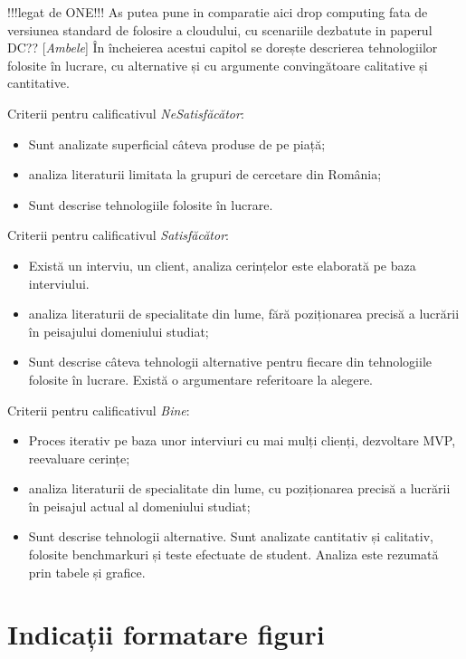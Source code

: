 \documentclass[12pt,a4paper]{report}
\newcommand{\worktype}[1]{[\textit{#1}] }
\newcommand{\dezvoltare}{\worktype{Dezvoltare de produs}}
\newcommand{\cercetare}{\worktype{Cercetare}}
\newcommand{\ambele}{\worktype{Ambele}}
\begin{document}
!!!legat de ONE!!!
As putea pune in comparatie aici drop computing fata de versiunea standard de folosire a cloudului, cu scenariile dezbatute in paperul DC??
\ambele În încheierea acestui capitol se dorește descrierea tehnologiilor folosite în lucrare, cu alternative și cu argumente convingătoare calitative și cantitative.  


Criterii pentru calificativul \textit{Ne\textit{Satisfăcător}}: 
\begin{itemize}
	\item \dezvoltare Sunt analizate superficial câteva produse de pe piață; 
	\item \cercetare analiza literaturii limitata la grupuri de cercetare din România;
	\item \ambele Sunt descrise tehnologiile folosite în lucrare. 
\end{itemize}

Criterii pentru calificativul \textit{Satisfăcător}:
\begin{itemize}
	\item \dezvoltare Există un interviu, un client, analiza cerințelor este elaborată pe baza interviului.
	\item \cercetare analiza literaturii de specialitate din lume, fără poziționarea precisă a lucrării în peisajului domeniului studiat;
	\item \ambele Sunt descrise câteva tehnologii alternative pentru fiecare din tehnologiile folosite în lucrare. Există o argumentare referitoare la alegere.
\end{itemize}

Criterii pentru calificativul \textit{Bine}:
\begin{itemize}
	\item \dezvoltare Proces iterativ pe baza unor interviuri cu mai mulți clienți, dezvoltare MVP, reevaluare cerințe;
	\item \cercetare analiza literaturii de specialitate din lume, cu poziționarea precisă a lucrării în peisajul actual al domeniului studiat; 
	\item \ambele Sunt descrise tehnologii alternative. Sunt analizate cantitativ și calitativ, folosite benchmarkuri și teste efectuate de student. Analiza este rezumată prin tabele și grafice.
\end{itemize}

\section{Indicații formatare figuri}
\end{document}
